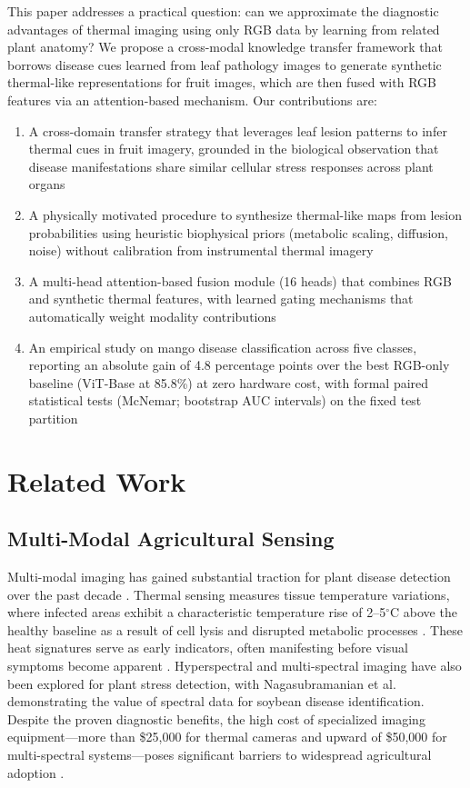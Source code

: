 \documentclass[utf8]{FrontiersinHarvard} %
\begin{document}
This paper addresses a practical question: can we approximate the diagnostic advantages of thermal imaging using only RGB data by learning from related plant anatomy? We propose a cross-modal knowledge transfer framework that borrows disease cues learned from leaf pathology images to generate synthetic thermal-like representations for fruit images, which are then fused with RGB features via an attention-based mechanism. Our contributions are:

\begin{enumerate}
    \item A cross-domain transfer strategy that leverages leaf lesion patterns to infer thermal cues in fruit imagery, grounded in the biological observation that disease manifestations share similar cellular stress responses across plant organs
    \item A physically motivated procedure to synthesize thermal-like maps from lesion probabilities using heuristic biophysical priors (metabolic scaling, diffusion, noise) without calibration from instrumental thermal imagery
    \item A multi-head attention-based fusion module (16 heads) that combines RGB and synthetic thermal features, with learned gating mechanisms that automatically weight modality contributions
    \item An empirical study on mango disease classification across five classes, reporting an absolute gain of 4.8 percentage points over the best RGB-only baseline (ViT-Base at 85.8\%) at zero hardware cost, with formal paired statistical tests (McNemar; bootstrap AUC intervals) on the fixed test partition
\end{enumerate}

\section{Related Work}

\subsection{Multi-Modal Agricultural Sensing}
Multi-modal imaging has gained substantial traction for plant disease detection over the past decade \cite{maimaitijiang2020,lu2020}. Thermal sensing measures tissue temperature variations, where infected areas exhibit a characteristic temperature rise of 2--5$^{\circ}$C above the healthy baseline as a result of cell lysis and disrupted metabolic processes \cite{mahlein2016}. These heat signatures serve as early indicators, often manifesting before visual symptoms become apparent \cite{pineda2021}. Hyperspectral and multi-spectral imaging have also been explored for plant stress detection, with Nagasubramanian et al. \cite{nagasubramanian2019} demonstrating the value of spectral data for soybean disease identification. Despite the proven diagnostic benefits, the high cost of specialized imaging equipment---more than \$25,000 for thermal cameras and upward of \$50,000 for multi-spectral systems---poses significant barriers to widespread agricultural adoption \cite{sishodia2020}.
\end{document}
